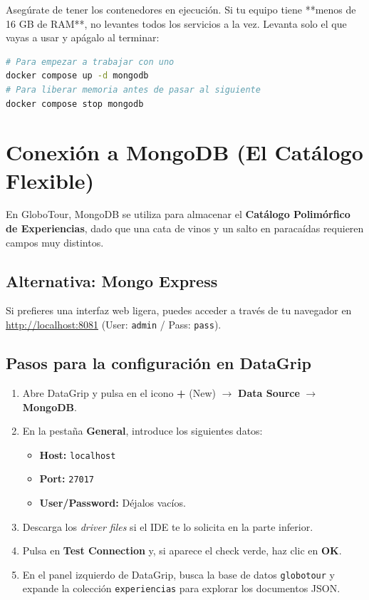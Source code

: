 \documentclass[12pt,a4paper]{article}
\begin{document}
\begin{tcolorbox}[title=Requisito Previo: Gestión de Recursos]
Asegúrate de tener los contenedores en ejecución. Si tu equipo tiene **menos de 16 GB de RAM**, no levantes todos los servicios a la vez. Levanta solo el que vayas a usar y apágalo al terminar:
\begin{lstlisting}[language=bash]
# Para empezar a trabajar con uno
docker compose up -d mongodb
# Para liberar memoria antes de pasar al siguiente
docker compose stop mongodb
\end{lstlisting}
\end{tcolorbox}

\section{Conexión a MongoDB (El Catálogo Flexible)}
En GloboTour, MongoDB se utiliza para almacenar el \textbf{Catálogo Polimórfico de Experiencias}, dado que una cata de vinos y un salto en paracaídas requieren campos muy distintos.

\subsection{Alternativa: Mongo Express}
Si prefieres una interfaz web ligera, puedes acceder a través de tu navegador en \url{http://localhost:8081} (User: \texttt{admin} / Pass: \texttt{pass}).

\subsection{Pasos para la configuración en DataGrip}
\begin{enumerate}
    \item Abre DataGrip y pulsa en el icono \textbf{+} (New) $\rightarrow$ \textbf{Data Source} $\rightarrow$ \textbf{MongoDB}.
    \item En la pestaña \textbf{General}, introduce los siguientes datos:
    \begin{itemize}
        \item \textbf{Host:} \texttt{localhost}
        \item \textbf{Port:} \texttt{27017}
        \item \textbf{User/Password:} Déjalos vacíos.
    \end{itemize}
    \item Descarga los \textit{driver files} si el IDE te lo solicita en la parte inferior.
    \item Pulsa en \textbf{Test Connection} y, si aparece el check verde, haz clic en \textbf{OK}.
    \item En el panel izquierdo de DataGrip, busca la base de datos \texttt{globotour} y expande la colección \texttt{experiencias} para explorar los documentos JSON.
\end{enumerate}
\end{document}
